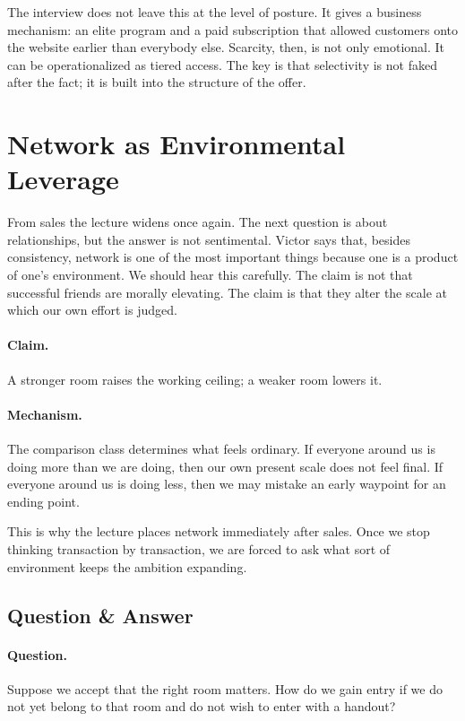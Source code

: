 The interview does not leave this at the level of posture. It gives a business mechanism: an elite program and a paid subscription that allowed customers onto the website earlier than everybody else. Scarcity, then, is not only emotional. It can be operationalized as tiered access. The key is that selectivity is not faked after the fact; it is built into the structure of the offer.

\section{Network as Environmental Leverage}

From sales the lecture widens once again. The next question is about relationships, but the answer is not sentimental. Victor says that, besides consistency, network is one of the most important things because one is a product of one's environment. We should hear this carefully. The claim is not that successful friends are morally elevating. The claim is that they alter the scale at which our own effort is judged.

\paragraph{Claim.}
A stronger room raises the working ceiling; a weaker room lowers it.

\paragraph{Mechanism.}
The comparison class determines what feels ordinary. If everyone around us is doing more than we are doing, then our own present scale does not feel final. If everyone around us is doing less, then we may mistake an early waypoint for an ending point.

This is why the lecture places network immediately after sales. Once we stop thinking transaction by transaction, we are forced to ask what sort of environment keeps the ambition expanding.

\subsection{Question \& Answer}

\paragraph{Question.}
Suppose we accept that the right room matters. How do we gain entry if we do not yet belong to that room and do not wish to enter with a handout?

